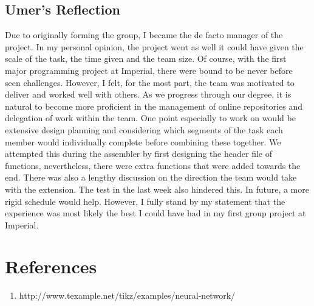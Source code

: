 \documentclass[11pt]{article}
\begin{document}
\subsection{Umer's Reflection}
Due to originally forming the group, I became the de facto manager of the project. In my personal opinion, the project went as well it could have given the scale of the task, the time given and the team size. Of course, with the first major programming project at Imperial, there were bound to be never before seen challenges. However, I felt, for the most part, the team was motivated to deliver and worked well with others. As we progress through our degree, it is natural to become more proficient in the management of online repositories and delegation of work within the team. One point especially to work on would be extensive design planning and considering which segments of the task each member would individually complete before combining these together. We attempted this during the assembler by first designing the header file of functions, nevertheless, there were extra functions that were added towards the end. There was also a lengthy discussion on the direction the team would take with the extension. The test in the last week also hindered this. In future, a more rigid schedule would help. However, I fully stand by my statement that the experience was most likely the best I could have had in my first group project at Imperial. 

\section{References}
\begin{enumerate}
    \item http://www.texample.net/tikz/examples/neural-network/
\end{enumerate}
\end{document}
